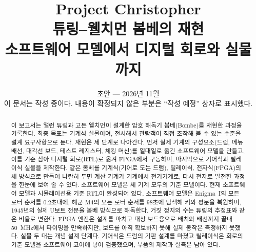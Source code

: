 \documentclass[11pt,a4paper,oneside]{report}
\title{\textbf{Project Christopher}\\[4mm]\Large 튜링--웰치먼 봄베의 재현\\[1mm]
  \large 소프트웨어 모델에서 디지털 회로와 실물까지}
\author{}
\date{초안 --- 2026년 11월\\[3mm]
  \normalsize\textcolor{cgray}{이 문서는 작성 중이다. 내용이 확정되지 않은 부분은 ``작성 예정'' 상자로 표시했다.}}
\begin{document}
\maketitle

\begin{abstract}
이 보고서는 앨런 튜링과 고든 웰치먼이 설계한 암호 해독기 봄베(Bombe)를 재현한 과정을 기록한다.
최종 목표는 기계식 실물이며, 전시해서 관람객이 직접 조작해 볼 수 있는 수준을 설계 요구사항으로 둔다.
재현은 세 단계로 나아간다. 먼저 실제 기계의 구성요소(드럼, 메뉴 배선, 대각선 보드, 테스트 레지스터,
체킹 머신)를 일대일로 옮긴 소프트웨어 모델을 만들고, 이를 기준 삼아 디지털 회로(RTL)로 옮겨 FPGA에서
구동하며, 마지막으로 기어식과 릴레이식 실물을 제작한다. 같은 봄베를 기계식(기어로 도는 드럼), 릴레이식,
전자식(FPGA)의 세 방식으로 만들어 나란히 두면 계산 기계가 기계에서 전기기계로, 다시 전자로 발전한 과정을
한눈에 보여 줄 수 있다. 소프트웨어 모델은 세 기계 모두의 기준 모델이다.
현재 소프트웨어 모델과 시뮬레이션용 기준 RTL이 완성되어 있다. 소프트웨어 모델은 Enigma~I의 모든 로터
순서를 0.2초대에, 해군 M4의 모든 로터 순서를 98초에 탐색해 키와 평문을 복원하며, 1945년의 실제 U보트
전문을 봄베 방식으로 해독한다. 거짓 정지의 수는 튜링의 추정표와 같은 비율로 변한다.
FPGA 엔진은 설계를 마치고 대상 보드용으로 배치와 배선까지 끝내 50~MHz에서 타이밍을 만족하지만, 보드를
아직 확보하지 못해 실제 동작은 측정하지 못했다. 실물 두 대는 개념 설계 단계다. 기어식은 드럼의 기판 설계를
마쳤고 릴레이식은 회로의 기준 모델을 소프트웨어 코어에 넣어 검증했으며, 부품의 제작과 실측은 남아 있다.
\end{abstract}

\tableofcontents










\appendix




\printbibliography[heading=bibintoc,title={참고 문헌}]
\end{document}
